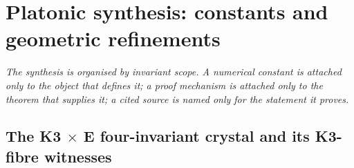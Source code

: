 %

\section{Platonic synthesis: constants and geometric refinements}
\label{wn:sec:spine-second-pass}

\emph{The synthesis is organised by invariant scope.  A numerical
constant is attached only to the object that defines it; a proof
mechanism is attached only to the theorem that supplies it; a cited
source is named only for the statement it proves.}

\subsection{The K3 $\times$ E four-invariant crystal and its K3-fibre
witnesses}
\label{wn:subsec:second-pass-six-invariants}

